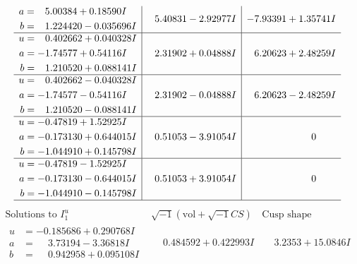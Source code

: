 \documentclass[1p]{elsarticle_modified}
\theoremstyle{definition}
\newcommand{\I}{\sqrt{-1}}
\begin{document}
$$\begin{array}{c|c|c}
\begin{aligned}
a &= \phantom{-}5.00384 + 0.18590 I \\
b &= \phantom{-}1.224420 - 0.035696 I\end{aligned}
 & \phantom{-}5.40831 - 2.92977 I & -7.93391 + 1.35741 I \\ \hline\begin{aligned}
u &= \phantom{-}0.402662 + 0.040328 I \\
a &= -1.74577 + 0.54116 I \\
b &= \phantom{-}1.210520 + 0.088141 I\end{aligned}
 & \phantom{-}2.31902 + 0.04888 I & \phantom{-}6.20623 + 2.48259 I \\ \hline\begin{aligned}
u &= \phantom{-}0.402662 - 0.040328 I \\
a &= -1.74577 - 0.54116 I \\
b &= \phantom{-}1.210520 - 0.088141 I\end{aligned}
 & \phantom{-}2.31902 - 0.04888 I & \phantom{-}6.20623 - 2.48259 I \\ \hline\begin{aligned}
u &= -0.47819 + 1.52925 I \\
a &= -0.173130 + 0.644015 I \\
b &= -1.044910 + 0.145798 I\end{aligned}
 & \phantom{-}0.51053 - 3.91054 I & \phantom{-0.000000 } 0 \\ \hline\begin{aligned}
u &= -0.47819 - 1.52925 I \\
a &= -0.173130 - 0.644015 I \\
b &= -1.044910 - 0.145798 I\end{aligned}
 & \phantom{-}0.51053 + 3.91054 I & \phantom{-0.000000 } 0\\
 \hline 
 \end{array}$$\newpage$$\begin{array}{c|c|c}  
\text{Solutions to }I^u_{1}& \I (\text{vol} + \sqrt{-1}CS) & \text{Cusp shape}\\
 \hline 
\begin{aligned}
u &= -0.185686 + 0.290768 I \\
a &= \phantom{-}3.73194 - 3.36818 I \\
b &= \phantom{-}0.942958 + 0.095108 I\end{aligned}
 & \phantom{-}0.484592 + 0.422993 I & \phantom{-}3.2353 + 15.0846 I \\ \hline\begin{aligned}

\end{aligned}
\end{array}$$
\end{document}
